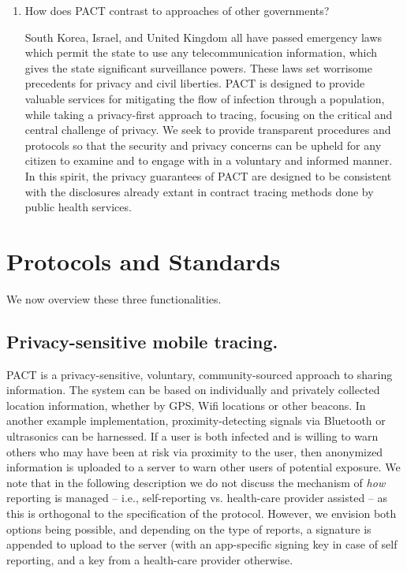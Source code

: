 \documentclass{article}
\begin{document}
\begin{enumerate}[leftmargin=*]
\item How does PACT contrast to approaches of other governments?

South Korea, Israel, and United Kingdom all have passed emergency laws which permit the state to use any telecommunication information, which gives the state significant surveillance powers. These laws set worrisome precedents for privacy and civil liberties. PACT is designed to provide valuable services for mitigating the flow of infection through a population, while taking a privacy-first approach to tracing, focusing on the critical and central challenge of privacy. We seek to provide transparent procedures and protocols so that the security and privacy concerns can be upheld for any citizen to examine and to engage with in a voluntary and informed manner.  In this spirit, the privacy guarantees of PACT are designed to be consistent with the disclosures already extant in contract tracing methods done by public health services. 

\end{enumerate}

\section{Protocols and Standards} 
We now overview these three functionalities.


\subsection{Privacy-sensitive mobile tracing.} 
PACT is a privacy-sensitive, voluntary, community-sourced approach to sharing information. The system can be based on individually and privately collected location information, whether by GPS, Wifi locations or other beacons.  In another example implementation, proximity-detecting signals via Bluetooth or ultrasonics can be harnessed.  If a user is both infected and is willing to warn others who may have been at risk via proximity to the user, then anonymized information is uploaded to a server to warn other users of potential exposure. We note that in the following description we do not discuss the mechanism of {\em how} reporting is managed -- i.e., self-reporting vs. health-care provider assisted -- as this is orthogonal to the specification of the protocol. However, we envision both options being possible, and depending on the type of reports, a signature is appended to upload to the server (with an app-specific signing key in case of self reporting, and a key from a health-care provider otherwise.
\end{document}
